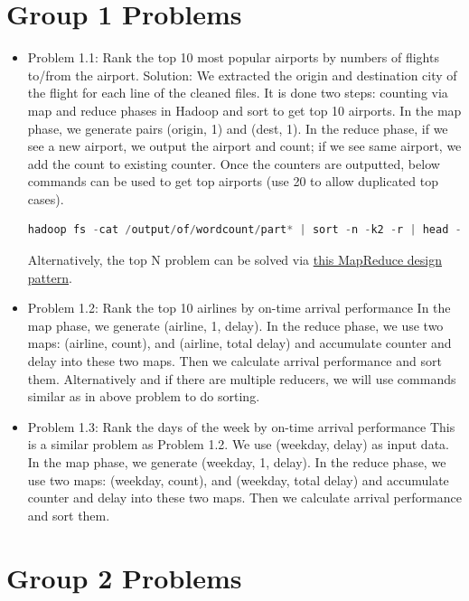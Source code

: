 \documentclass[fontsize=11pt,paper=a4]{scrartcl}
\begin{document}
 
 
\section{Group 1 Problems} 

\begin{itemize} 
\item Problem 1.1: Rank the top 10 most popular airports by numbers of flights to/from the airport.
Solution: We extracted the origin and destination city of the flight for each line of the cleaned files. It is done two steps: counting via map and reduce phases in Hadoop and sort to get top 10 airports. In the map phase, we generate pairs (origin, 1) and (dest, 1). In the reduce phase, if we see a new airport, we output the airport and count; if we see same airport, we add the count to existing counter. Once the counters are outputted, below commands can be used to get top airports (use 20 to allow duplicated top cases). 
\begin{lstlisting}[language = C++]
hadoop fs -cat /output/of/wordcount/part* | sort -n -k2 -r | head -n20
\end{lstlisting}
Alternatively, the top N problem can be solved via \href{https://github.com/adamjshook/mapreducepatterns/blob/master/MRDP/src/main/java/mrdp/ch3/TopTenDriver.java}{this MapReduce design pattern}. 

\item Problem 1.2: Rank the top 10 airlines by on-time arrival performance
In the map phase, we generate (airline, 1, delay). In the reduce phase, we use two maps: (airline, count), and (airline, total delay) and accumulate counter and delay into these two maps. Then we calculate arrival performance and sort them. Alternatively and if there are multiple reducers, we will use commands similar as in above problem to do sorting. 

\item Problem 1.3: Rank the days of the week by on-time arrival performance
This is a similar problem as Problem 1.2. We use (weekday, delay) as input data. In the map phase, we generate (weekday, 1, delay). In the reduce phase, we use two maps: (weekday, count), and (weekday, total delay) and accumulate counter and delay into these two maps. Then we calculate arrival performance and sort them.   

\end{itemize}
 
\section{Group 2 Problems}
 
\end{document}
